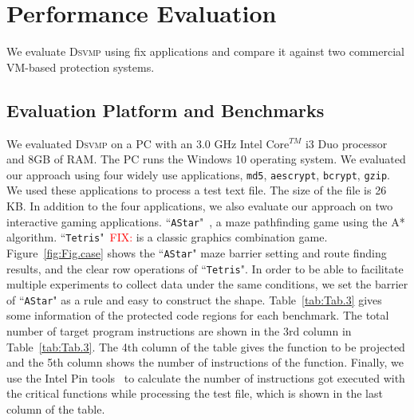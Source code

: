 \documentclass[preprint,12pt,3p]{elsarticle}
\newcommand{\DSVMP}{\textsc{Dsvmp}\xspace}
\newcommand\FIXME[1]{\textcolor{red}{FIX:}\textcolor{red}{#1}}
\begin{document}
\section{Performance Evaluation}\label{sec:p-eva}
We evaluate \DSVMP using fix  applications
and compare it against two commercial VM-based protection systems.

\subsection{Evaluation Platform and Benchmarks}
We evaluated \DSVMP on a PC with an 3.0 GHz Intel Core$^{TM}$ i3 Duo processor and 8GB of RAM.
The PC runs the Windows 10 operating system. We evaluated our approach using four widely use applications, \texttt{md5}, \texttt{aescrypt}, \texttt{bcrypt}, \texttt{gzip}. 
We used these applications to process a test text file. The size of the file is 26 KB.
In addition to the four applications, we also evaluate our approach on two interactive gaming applications.
``\texttt{AStar}"~\cite{}, a maze pathfinding game using the A* algorithm. ``\texttt{Tetris}"~\FIXME{\cite{}} is a classic graphics combination game.
Figure~\ref{fig:Fig.case} shows the ``\texttt{AStar}" maze barrier setting and route finding results, and the clear row operations of ``\texttt{Tetris}".
In order to be able to facilitate multiple experiments to collect data under the same conditions, we set the barrier of ``\texttt{AStar}" as a rule and easy to construct the shape.
Table~\ref{tab:Tab.3} gives some information of the protected code regions for each benchmark.
The total number of target program instructions are shown in the 3rd column in Table~\ref{tab:Tab.3}.
The 4th column of the table gives the function to be projected
and the 5th column shows the number of instructions of the function.
Finally, we use the Intel Pin tools~\cite{pin} to calculate the number of instructions got executed with the critical functions
while processing the test file, which is shown in the last column of the table.
\end{document}
